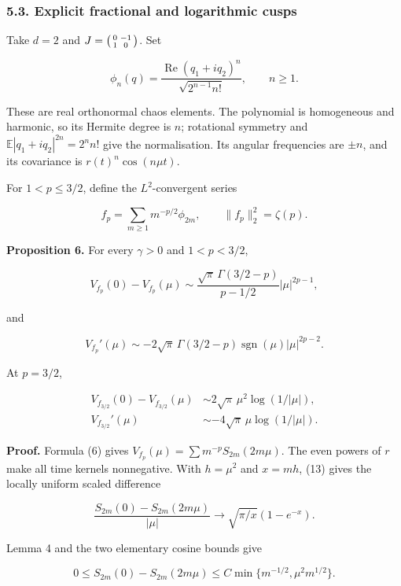 \documentclass[
  british,
  11pt,
  a4paper,
]{article}
\begin{document}
\subsubsection{5.3. Explicit fractional and logarithmic
cusps}\label{explicit-fractional-and-logarithmic-cusps}

Take \(d=2\) and \(J=\begin{psmallmatrix}0&-1\\1&0\end{psmallmatrix}\).
Set

\[
\phi_n(q)=\frac{\mathop{\mathrm{Re}}(q_1+iq_2)^n}{\sqrt{2^{n-1}n!}},\qquad n\ge1.
\]

These are real orthonormal chaos elements. The polynomial is homogeneous
and harmonic, so its Hermite degree is \(n\); rotational symmetry and
\(\mathbb E|q_1+iq_2|^{2n}=2^n n!\) give the normalisation. Its angular
frequencies are \(\pm n\), and its covariance is \(r(t)^n\cos(n\mu t)\).

For \(1<p\le3/2\), define the \(L^2\)-convergent series

\[
f_p=\sum_{m\ge1}m^{-p/2}\phi_{2m},\qquad
\|f_p\|_2^2=\zeta(p). \tag{17}
\]

\textbf{Proposition 6.} For every \(\gamma>0\) and \(1<p<3/2\),

\[
V_{f_p}(0)-V_{f_p}(\mu)
\sim\frac{\sqrt\pi\,\Gamma(3/2-p)}{p-1/2}|\mu|^{2p-1}, \tag{18}
\]

and

\[
V_{f_p}'(\mu)\sim-2\sqrt\pi\,\Gamma(3/2-p)
\operatorname{sgn}(\mu)|\mu|^{2p-2}. \tag{19}
\]

At \(p=3/2\),

\[
\begin{aligned}
V_{f_{3/2}}(0)-V_{f_{3/2}}(\mu)
&\sim2\sqrt\pi\,\mu^2\log(1/|\mu|),\\
V_{f_{3/2}}'(\mu)&\sim-4\sqrt\pi\,\mu\log(1/|\mu|).
\end{aligned} \tag{20}
\]

\textbf{Proof.} Formula (6) gives
\(V_{f_p}(\mu)=\sum m^{-p}S_{2m}(2m\mu)\). The even powers of \(r\) make
all time kernels nonnegative. With \(h=\mu^2\) and \(x=mh\), (13) gives
the locally uniform scaled difference

\[
\frac{S_{2m}(0)-S_{2m}(2m\mu)}{|\mu|}
\longrightarrow\sqrt{\pi/x}(1-e^{-x}).
\]

Lemma 4 and the two elementary cosine bounds give

\[
0\le S_{2m}(0)-S_{2m}(2m\mu)
\le C\min\{m^{-1/2},\mu^2m^{1/2}\}. \tag{21}
\]
\end{document}
